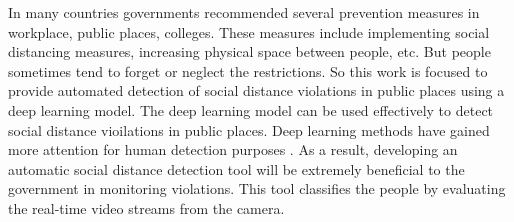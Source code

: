 \documentclass[conference]{IEEEtran}
\begin{document}
\par 
In many countries governments recommended several prevention measures in workplace, public places, colleges. These measures include implementing social distancing measures, increasing physical space between people, etc. But people sometimes tend to forget or neglect the restrictions. So this work is focused to provide automated detection of social distance violations in public places using a deep learning model. The deep learning model can be used effectively to detect social distance vioilations in public places. Deep learning methods have gained more attention for human detection purposes \cite{humandetecion}. As a result, developing an automatic social distance detection tool will be extremely beneficial to the government in monitoring violations. This tool classifies the people by evaluating the real-time video streams from the camera. 
\end{document}
